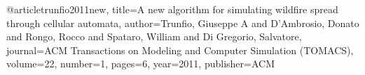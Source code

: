 @article{trunfio2011new,
  title={A new algorithm for simulating wildfire spread through cellular automata},
  author={Trunfio, Giuseppe A and D’Ambrosio, Donato and Rongo, Rocco and Spataro, William and Di Gregorio, Salvatore},
  journal={ACM Transactions on Modeling and Computer Simulation (TOMACS)},
  volume={22},
  number={1},
  pages={6},
  year={2011},
  publisher={ACM}
}